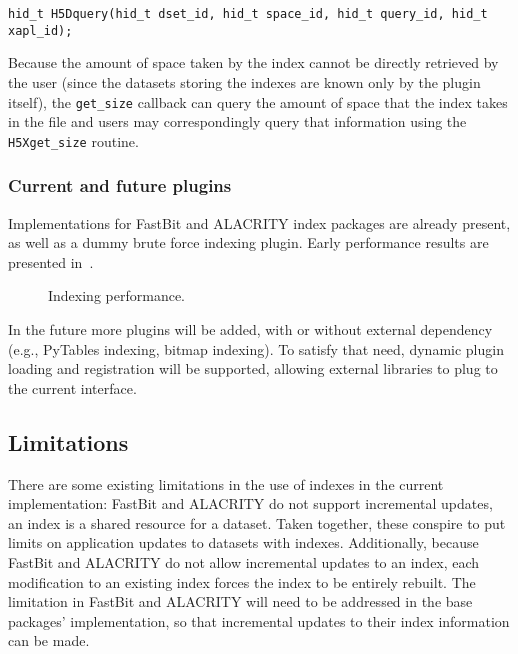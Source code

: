 {
\begin{lstlisting}
hid_t H5Dquery(hid_t dset_id, hid_t space_id, hid_t query_id, hid_t xapl_id);
\end{lstlisting}
}

Because the amount of space taken by the index cannot be directly retrieved by
the user (since the datasets storing the indexes are known only by the plugin
itself), the \texttt{get\_size} callback can query the amount of space that
the index takes in the file and users may correspondingly query that information using the
\texttt{H5Xget\_size} routine.

\subsubsection{Current and future plugins}

Implementations for FastBit and ALACRITY index packages are already
present, as well as a dummy brute force indexing plugin. Early performance results
are presented in~.

\begin{figure}
\vspace{-10pt}

\caption{Indexing performance.}
\label{fig:indexing_perf}
\vspace{-20pt}
\end{figure}

In the future more plugins will be added, with or without external dependency
(e.g., PyTables indexing, bitmap indexing).
To satisfy that need, dynamic plugin loading and registration will be supported,
allowing external libraries to plug to the current interface.

\subsection{Limitations}

There are some existing limitations in the use of indexes in the current
implementation: FastBit and ALACRITY do not support incremental updates,
an index is a shared resource for a dataset. Taken together, these conspire to
put limits on application updates to datasets with indexes.
Additionally, because FastBit and ALACRITY do not allow incremental updates to
an index, each modification to an existing index forces the index to be entirely
rebuilt. The limitation in FastBit and ALACRITY will need to be addressed in
the base packages' implementation, so that incremental updates
to their index information can be made.


